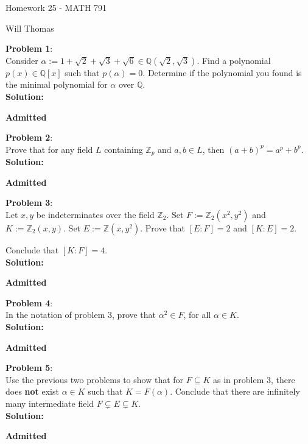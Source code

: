 \documentclass[11pt]{article}
\newcommand{\prob}[3]{\begin{flushleft}
        \textbf{Problem #1}: \\
        #2 
		\textbf{Solution:} 
		#3

\end{flushleft}}
\newcommand{\admit}{
  \begin{flushright}
    \textbf{Admitted}
  \end{flushright}
}
\newcommand{\makeHWtitle}[1]{
    \begin{center}
    \Large{Homework #1 - MATH 791} 
        \vspace{5pt}
        
        \normalsize{Will Thomas}
        \vspace{5pt}
    \end{center}
}
\begin{document}
\makeHWtitle{25}

\prob{1}{
  Consider $\alpha := 1 + \sqrt{2} + \sqrt{3} + \sqrt{6} \in \mathbb{Q}(\sqrt{2}, \sqrt{3})$. 
  Find a polynomial $p(x) \in \mathbb{Q}[x]$ such that $p(\alpha) = 0$. Determine if the polynomial you found is the minimal polynomial for $\alpha$ over $\mathbb{Q}$. \\
}{\\
\admit
}

\prob{2}{
  Prove that for any field $L$ containing $\mathbb{Z}_p$ and $a, b \in L$, then $(a + b)^p = a^p + b^p$. \\
}{\\
\admit
}

\prob{3}{
  Let $x,y$ be indeterminates over the field $\mathbb{Z}_2$. Set $F := \mathbb{Z}_2(x^2, y^2)$ and $K := \mathbb{Z}_2(x,y)$. Set $E := \mathbb{Z}(x,y^2)$.
  Prove that $[E : F] = 2$ and $[K : E] = 2$.
  
  Conclude that $[K : F] = 4$. \\
}{\\
\admit
}

\prob{4}{
  In the notation of problem 3, prove that $\alpha^2 \in F$, for all $\alpha \in K$. \\
}{\\
\admit
}

\prob{5}{
  Use the previous two problems to show that for $F \subseteq K$ as in problem 3, there does \textbf{not} exist $\alpha \in K$ such that $K = F(\alpha)$.
  Conclude that there are infinitely many intermediate field $F \subsetneq E \subsetneq K$. \\
}{\\
\admit
}
\end{document}
